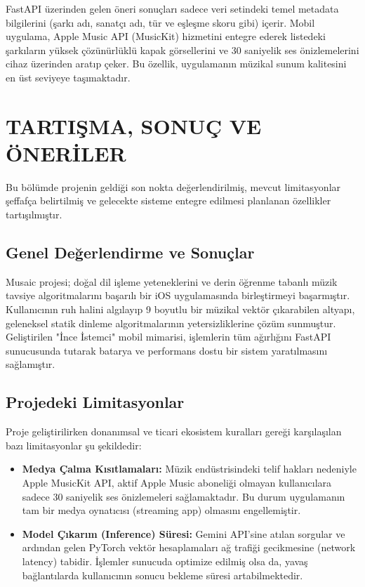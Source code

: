 \documentclass[12pt, a4paper]{report}
\begin{document}
FastAPI üzerinden gelen öneri sonuçları sadece veri setindeki temel metadata bilgilerini (şarkı adı, sanatçı adı, tür ve eşleşme skoru gibi) içerir. Mobil uygulama, Apple Music API (MusicKit) hizmetini entegre ederek listedeki şarkıların yüksek çözünürlüklü kapak görsellerini ve 30 saniyelik ses önizlemelerini cihaz üzerinden aratıp çeker. Bu özellik, uygulamanın müzikal sunum kalitesini en üst seviyeye taşımaktadır.

\chapter{TARTIŞMA, SONUÇ VE ÖNERİLER}

Bu bölümde projenin geldiği son nokta değerlendirilmiş, mevcut limitasyonlar şeffafça belirtilmiş ve gelecekte sisteme entegre edilmesi planlanan özellikler tartışılmıştır.

\section{Genel Değerlendirme ve Sonuçlar}

Musaic projesi; doğal dil işleme yeteneklerini ve derin öğrenme tabanlı müzik tavsiye algoritmalarını başarılı bir iOS uygulamasında birleştirmeyi başarmıştır. Kullanıcının ruh halini algılayıp 9 boyutlu bir müzikal vektör çıkarabilen altyapı, geleneksel statik dinleme algoritmalarının yetersizliklerine çözüm sunmuştur. Geliştirilen "İnce İstemci" mobil mimarisi, işlemlerin tüm ağırlığını FastAPI sunucusunda tutarak batarya ve performans dostu bir sistem yaratılmasını sağlamıştır.

\section{Projedeki Limitasyonlar}

Proje geliştirilirken donanımsal ve ticari ekosistem kuralları gereği karşılaşılan bazı limitasyonlar şu şekildedir:
\begin{itemize}
    \item \textbf{Medya Çalma Kısıtlamaları:} Müzik endüstrisindeki telif hakları nedeniyle Apple MusicKit API, aktif Apple Music aboneliği olmayan kullanıcılara sadece 30 saniyelik ses önizlemeleri sağlamaktadır. Bu durum uygulamanın tam bir medya oynatıcısı (streaming app) olmasını engellemiştir.
    \item \textbf{Model Çıkarım (Inference) Süresi:} Gemini API'sine atılan sorgular ve ardından gelen PyTorch vektör hesaplamaları ağ trafiği gecikmesine (network latency) tabidir. İşlemler sunucuda optimize edilmiş olsa da, yavaş bağlantılarda kullanıcının sonucu bekleme süresi artabilmektedir.
\end{itemize}
\end{document}
